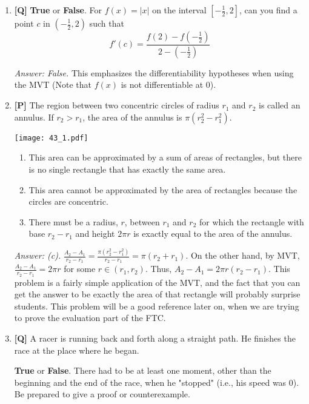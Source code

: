 \documentclass[12pt]{article}
\begin{document}
\begin{enumerate}
\bigskip

\item {\bf [Q]} 
\textbf{True} or \textbf{False}. For $f(x) = |x|$ on the interval
 $[-\frac{1}{2}, 2]$, can you find a
point $c$ in $(-\frac{1}{2},2)$ such that
\[f'(c) = \frac{f(2) - f(-\frac{1}{2})}{2-(-\frac{1}{2})}\]

{\it Answer: False.} This emphasizes the differentiability
hypotheses when using the MVT (Note that $f(x)$ is not differentiable at 0).

\bigskip

\item {\bf [P]} The region between two concentric circles of radius $r_1$
 and $r_2$ is called an annulus. If $r_2 >r_1$, the area of the
 annulus is $\pi (r_2^2 -r_1^2)$.

\begin{center}
\texttt{[image: 43\_1.pdf]}
\end{center}


\begin{enumerate}
\item This area can be approximated by a sum of areas of rectangles, but
there is no single rectangle that has exactly the same area.
\item This area cannot be approximated by the area of rectangles
because the circles are concentric.
\item There must be a radius, $r$,  between $r_1$ and $r_2$ for which
the rectangle with base $r_2 -r_1$ and height $2\pi r$ is exactly
equal to the area of the annulus.
\end{enumerate}

{\it Answer: (c).} $\displaystyle { \frac{A_2-A_1}{r_2-r_1}=\frac {\pi (r^2_2-r^2_1)}{r_2-r_1}=\pi (r_2+r_1)}$. On the other hand, by MVT, $\displaystyle { \frac{A_2-A_1}{r_2-r_1}=2\pi r}$ for some $r \in (r_1, r_2)$. Thus, $A_2-A_1=2\pi r (r_2-r_1)$. This problem is a fairly simple application
of the MVT, and the fact that you can get the answer to be exactly
the area of that rectangle will probably surprise students. This
problem will be a good reference later on, when we are trying to
prove the evaluation part of the FTC. 

\bigskip

\item {\bf [Q]} A racer is running back and forth along a straight path.  He
finishes the race at the place where he began.

\textbf{True} or \textbf{False}.  There had to be at least one
moment, other than the beginning and the end of the race, when he
"stopped" (i.e., his speed was 0). Be prepared to give a proof or
counterexample.


\end{enumerate}
\end{document}

